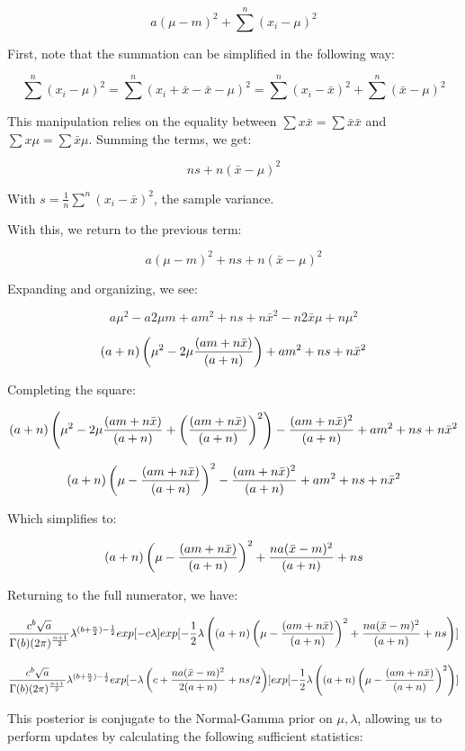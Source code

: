 \documentclass[twoside,11pt]{homework}
\begin{document}
\[
a(\mu - m)^2 + \sum^n(x_i - \mu)^2
\]

First, note that the summation can be simplified in the following way:

\[
\sum^n(x_i - \mu)^2 = \sum^n(x_i + \bar{x} - \bar{x} - \mu)^2 = \sum^n (x_i - \bar{x})^2 + \sum^n (\bar{x} - \mu)^2
\]

This manipulation relies on the equality between $\sum x \bar{x} = \sum \bar{x} \bar{x}$ and $\sum x \mu = \sum \bar{x} \mu$.
Summing the terms, we get:

\[
ns + n(\bar{x} - \mu)^2
\]

With $s = \frac{1}{n} \sum^n (x_i - \bar{x})^2$, the sample variance.

With this, we return to the previous term:

\[
a(\mu - m)^2 + ns + n(\bar{x} - \mu)^2
\]

Expanding and organizing, we see:

\[
a\mu^2 - a2\mu m + am^2 + ns + n\bar{x}^2 - n2\bar{x}\mu + n\mu^2
\]

\[
(a+n)\left(\mu^2 - 2\mu \frac{(am + n\bar{x})} {(a+n)}\right)
+ am^2 + ns + n\bar{x}^2
\]

Completing the square:

\[
(a+n)
\left(
\mu^2 - 2\mu \frac{(am + n\bar{x})}{(a+n)} + \left(\frac{(am + n\bar{x})}{(a+n)}\right)^2
\right) - \frac{(am + n\bar{x})^2}{(a+n)} + am^2 + ns + n\bar{x}^2
\]

\[
(a+n)
\left(
\mu - \frac{(am + n\bar{x})}{(a+n)}
\right)^2 - \frac{(am + n\bar{x})^2}{(a+n)} + am^2 + ns + n\bar{x}^2
\]

Which simplifies to:

\[
(a+n)
\left(
\mu - \frac{(am + n\bar{x})}{(a+n)}
\right)^2 + \frac{na(\bar{x} - m)^2}{(a+n)} + ns
\]

Returning to the full numerator, we have:

\[
\frac{c^b\sqrt{a}}{\Gamma{(b)}(2\pi)^{\frac{n+1}{2}}}
\lambda^{(b+\frac{n}{2})-\frac{1}{2}}
exp[-c\lambda]
exp[-\frac{1}{2}\lambda
\left(
(a+n)
\left(
\mu - \frac{(am + n\bar{x})}{(a+n)}
\right)^2 + \frac{na(\bar{x} - m)^2}{(a+n)} + ns
\right)]
\]

\[
\frac{c^b\sqrt{a}}{\Gamma{(b)}(2\pi)^{\frac{n+1}{2}}}
\lambda^{(b+\frac{n}{2})-\frac{1}{2}}
exp[-\lambda \left(c + \frac{na(\bar{x} - m)^2}{2(a+n)} + ns/2\right)]
exp[-\frac{1}{2}\lambda
\left(
(a+n)
\left(
\mu - \frac{(am + n\bar{x})}{(a+n)}
\right)^2\right)]
\]

This posterior is conjugate to the Normal-Gamma prior on $\mu, \lambda$, allowing us to perform updates by calculating the following sufficient statistics:
\end{document}
